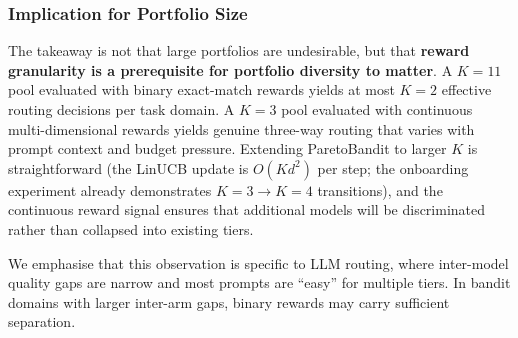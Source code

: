 \subsubsection{Implication for Portfolio Size}

The takeaway is not that large portfolios are undesirable, but
that \textbf{reward granularity is a prerequisite for portfolio
diversity to matter}.
A $K{=}11$ pool evaluated with binary exact-match rewards yields
at most $K{=}2$ effective routing decisions per task domain.
A $K{=}3$ pool evaluated with continuous multi-dimensional rewards
yields genuine three-way routing that varies with prompt context
and budget pressure.
Extending ParetoBandit to larger $K$ is straightforward (the
LinUCB update is $O(Kd^2)$ per step; the onboarding experiment
already demonstrates $K{=}3 \to K{=}4$ transitions), and the
continuous reward signal ensures that additional models will be
discriminated rather than collapsed into existing tiers.

We emphasise that this observation is specific to LLM routing,
where inter-model quality gaps are narrow and most prompts are
``easy'' for multiple tiers.
In bandit domains with larger inter-arm gaps, binary rewards
may carry sufficient separation.
